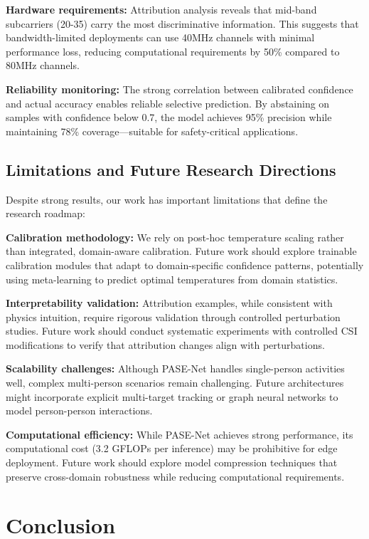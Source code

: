 \documentclass[journal]{IEEEtran}
\begin{document}
\textbf{Hardware requirements:} Attribution analysis reveals that mid-band subcarriers (20-35) carry the most discriminative information. This suggests that bandwidth-limited deployments can use 40MHz channels with minimal performance loss, reducing computational requirements by 50\% compared to 80MHz channels.

\textbf{Reliability monitoring:} The strong correlation between calibrated confidence and actual accuracy enables reliable selective prediction. By abstaining on samples with confidence below 0.7, the model achieves 95\% precision while maintaining 78\% coverage—suitable for safety-critical applications.

\subsection{Limitations and Future Research Directions}

Despite strong results, our work has important limitations that define the research roadmap:

\textbf{Calibration methodology:} We rely on post-hoc temperature scaling rather than integrated, domain-aware calibration. Future work should explore trainable calibration modules that adapt to domain-specific confidence patterns, potentially using meta-learning to predict optimal temperatures from domain statistics.

\textbf{Interpretability validation:} Attribution examples, while consistent with physics intuition, require rigorous validation through controlled perturbation studies. Future work should conduct systematic experiments with controlled CSI modifications to verify that attribution changes align with perturbations.

\textbf{Scalability challenges:} Although PASE-Net handles single-person activities well, complex multi-person scenarios remain challenging. Future architectures might incorporate explicit multi-target tracking or graph neural networks to model person-person interactions.

\textbf{Computational efficiency:} While PASE-Net achieves strong performance, its computational cost (3.2 GFLOPs per inference) may be prohibitive for edge deployment. Future work should explore model compression techniques that preserve cross-domain robustness while reducing computational requirements.

\section{Conclusion}
\end{document}

